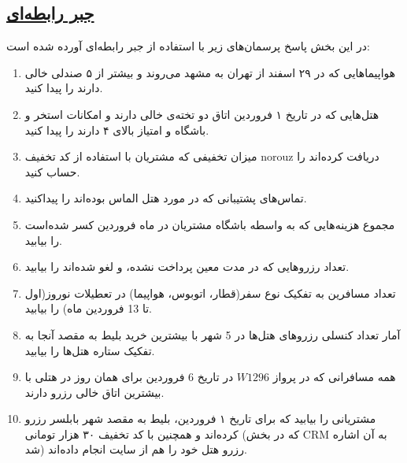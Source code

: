\documentclass[12pt]{exam}
\begin{document}
\subsection*{\underline{جبر رابطه‌ای}}

در این بخش پاسخ پرسمان‌های زیر با استفاده از جبر رابطه‌ای آورده شده است:

\begin{enumerate}
	\item
‌هواپیماهایی که در ۲۹ اسفند از تهران به مشهد می‌روند و بیشتر از ۵ صندلی خالی دارند را پیدا کنید.




	\item
هتل‌هایی که در تاریخ ۱ فروردین اتاق دو تخته‌ی خالی دارند و امکانات استخر و باشگاه و \linebreak امتیاز بالای ۴ دارند را پیدا کنید.




	\item
	 میزان تخفیفی که مشتریان با استفاده از کد تخفیف  norouz  دریافت کرده‌اند را حساب کنید.
	 
	 
	 
	 
	\item
	 تماس‌های پشتیبانی که در مورد هتل الماس بوده‌اند را پیداکنید.
	 
	 
	 
	 
	 
	\item
مجموع هزینه‌هایی که‌ به واسطه باشگاه مشتریان در ماه فروردین کسر شده‌است را بیابید.




	\item
تعداد رزروهایی که در مدت معین پرداخت نشده، و لغو شده‌اند را بیابید.





	\item
تعداد مسافرین به تفکیک نوع سفر(قطار، اتوبوس، هواپیما) در تعطیلات نوروز(اول تا 13 فروردین ماه) را بیابید.





	
	\item
	 آمار تعداد کنسلی رزروهای هتل‌ها در 5 شهر با بیشترین خرید بلیط به مقصد آنجا به‌ تفکیک ستاره هتل‌ها را بیابید.
	 
	 
	 
	 
	
	\item
	 همه مسافرانی که در پرواز $W1296$ در تاریخ 6 فروردین برای همان روز در هتلی با بیشترین اتاق خالی رزرو دارند.
	
	
	
	
	
	\item
	 مشتریانی را بیابید که برای تاریخ ۱ فروردین، بلیط به مقصد شهر بابلسر رزرو کرده‌اند و همچنین \linebreak با کد تخفیف ۳۰ هزار تومانی (که در بخش CRM به‌ آن اشاره شد) رزرو هتل خود را هم از سایت انجام داده‌اند.
	 
	 
	 
	 
	
\end{enumerate}
\end{document}
